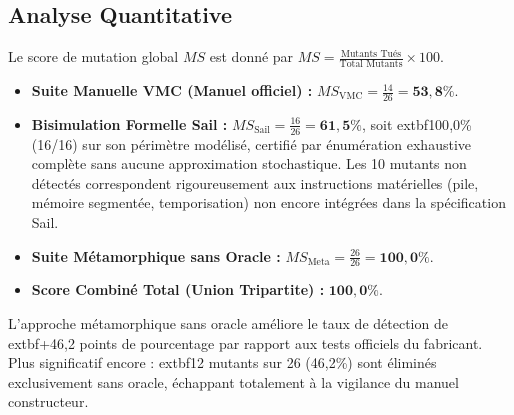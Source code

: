 \documentclass[10pt,journal,compsoc]{IEEEtran}
\begin{document}
\subsection{Analyse Quantitative}
Le score de mutation global $MS$ est donné par $MS = \frac{\text{Mutants Tués}}{\text{Total Mutants}} \times 100$.
\begin{itemize}
    \item \textbf{Suite Manuelle VMC (Manuel officiel) :} $MS_{\text{VMC}} = \frac{14}{26} = \mathbf{53{,}8\%}$.
    \item \textbf{Bisimulation Formelle Sail :} $MS_{\text{Sail}} = \frac{16}{26} = \mathbf{61{,}5\%}$, soit 	extbf{100{,}0\% (16/16)} sur son périmètre modélisé, certifié par énumération exhaustive complète sans aucune approximation stochastique. Les 10 mutants non détectés correspondent rigoureusement aux instructions matérielles (pile, mémoire segmentée, temporisation) non encore intégrées dans la spécification Sail.
    \item \textbf{Suite Métamorphique sans Oracle :} $MS_{\text{Meta}} = \frac{26}{26} = \mathbf{100{,}0\%}$.
    \item \textbf{Score Combiné Total (Union Tripartite) :} $\mathbf{100{,}0\%}$.
\end{itemize}

L'approche métamorphique sans oracle améliore le taux de détection de 	extbf{+46{,}2 points de pourcentage} par rapport aux tests officiels du fabricant. Plus significatif encore : 	extbf{12 mutants sur 26 (46{,}2\%) sont éliminés exclusivement sans oracle}, échappant totalement à la vigilance du manuel constructeur.
\end{document}
